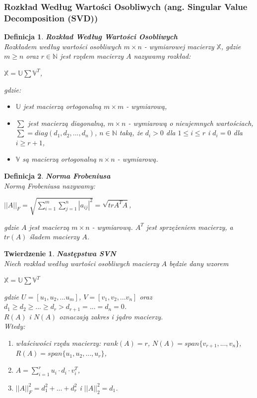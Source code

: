 \documentclass[12pt,a4paper]{report}
\newtheorem{df}{Definicja}
\newtheorem{tw}{Twierdzenie}
\begin{document}
\subsubsection{Rozkład Według Wartości Osobliwych (ang. Singular Value Decomposition (SVD))} 
\begin{df} \textbf{Rozkład Według Wartości Osobliwych}%
\\Rozkładem według wartości osobliwych $m\times n$ - wymiarowej macierzy $\mathbb{X}$, gdzie $m\geq n$ oraz $r \in \mathbb{N}$ jest rzędem macierzy $A$ nazywamy rozkład:
\begin{center}
$\mathbb{X}=\mathbb{U}\sum \mathbb{V}^T$,
\end{center}  
gdzie:
\begin{itemize}
\item $\mathbb{U}$ jest macierzą ortogonalną $m \times m$ - wymiarową,
\item $\sum $ jest macierzą diagonalną, $m \times n$ - wymiarową o nieujemnych wartościach, $\sum = diag(d_1, d_2,..., d_n)$, $n \in \mathbb{N}$ taką, że $d_i>0$ dla $1\leq i \leq r$ i $d_i=0$ dla $i\geq r+1$,
\item $\mathbb{V}$ są macierzą ortogonalną $n \times n$ - wymiarową.
\end{itemize}
\end{df}
\begin{df}\textbf{Norma Frobeniusa}%
\\Normą Frobeniusa nazywamy:
\begin{center}
$||A||_F = \sqrt{\sum_{i=1}^m \sum_{j=1}^n |a_{ij}|^2} = \sqrt{tr A^T A}$,
\end{center}
gdzie $A$ jest macierzą $m\times n$ - wymiarową. $ A^T$ jest sprzężeniem macierzy, a $tr(A)$ śladem macierzy $A$.
\end{df}

\begin{tw}\textbf{Następstwa SVN}%
\\Niech rozkład według wartości osobliwych macierzy $A$ będzie dany wzorem
\begin{center}
$\mathbb{X}=\mathbb{U}\sum \mathbb{V}^T$
\end{center}
gdzie $U=[u_1,u_2,...u_m]$, $V = [v_1,v_2,...v_n]$ oraz 
\\$d_1\geq d_2 \geq ... \geq d_r > d_{r+1} = ... = d_n = 0$.
\\$R(A)$ i $N(A)$ oznaczają zakres i jądro macierzy.
\\Wtedy:
\begin{enumerate}
\item właściwości rzędu macierzy: $rank(A) = r$, $N(A) = span\{v_{r+1},...,v_n \}$, $R(A) = span \{u_1,u_2,...,u_r \}$,
\item $A = \sum_{i=1}^r u_i \cdot d_i \cdot v_i^T$,
\item $||A||_F^2 = d_1^2+...+d_r^2$ i $||A||_2^2 = d_1$.
\end{enumerate}
\end{tw}
\end{document}
